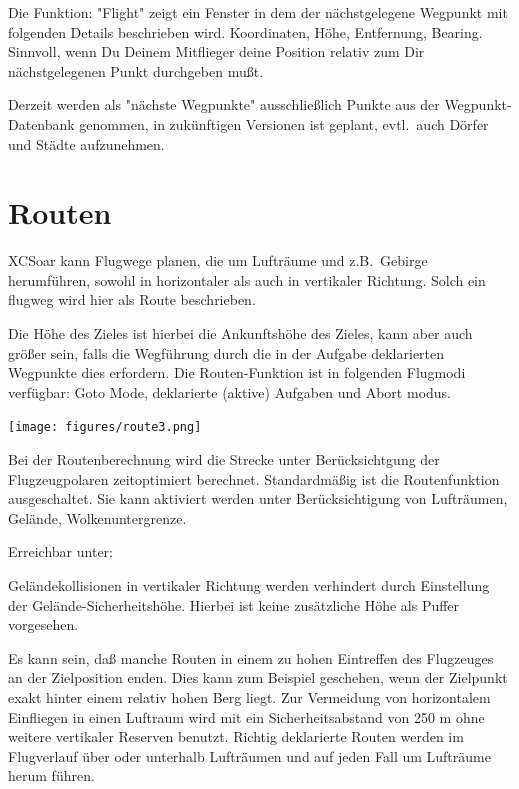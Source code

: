 Die Funktion: "Flight" zeigt ein Fenster in dem der nächstgelegene Wegpunkt mit folgenden Details beschrieben wird. Koordinaten, Höhe, Entfernung, Bearing.
Sinnvoll, wenn Du Deinem Mitflieger deine Position relativ zum Dir nächstgelegenen Punkt durchgeben mußt.

Derzeit werden als "nächste Wegpunkte" ausschließlich Punkte aus der Wegpunkt-Datenbank genommen, in zukünftigen Versionen ist geplant, evtl.\  auch Dörfer und Städte aufzunehmen.

\section{Routen}\label{sec:route}

\textsf{XCSoar} kann Flugwege planen, die um Lufträume und z.B.\ Gebirge herumführen, sowohl in horizontaler als auch in vertikaler Richtung. Solch ein flugweg wird hier als Route beschrieben.

Die Höhe des Zieles ist hierbei die Ankunftshöhe des Zieles, kann aber auch größer sein, falls die Wegführung durch die in der Aufgabe deklarierten Wegpunkte dies erfordern.
Die Routen-Funktion ist in folgenden Flugmodi verfügbar:
Goto Mode, deklarierte (aktive) Aufgaben und Abort modus.

\begin{center}
\texttt{[image: figures/route3.png]}
\end{center}

Bei der Routenberechnung wird die Strecke unter Berücksichtgung der Flugzeugpolaren zeitoptimiert berechnet. Standardmäßig ist die Routenfunktion ausgeschaltet. Sie kann aktiviert werden unter   Berücksichtigung von Lufträumen, Gelände, Wolkenuntergrenze.

Erreichbar unter:
\begin{quote}
\blink{}\blink{}\blink{}
\end{quote}

Geländekollisionen in vertikaler Richtung werden verhindert durch Einstellung der Gelände-Sicherheitshöhe.  Hierbei ist keine zusätzliche Höhe als Puffer vorgesehen.

Es kann sein, daß manche Routen in einem  zu hohen Eintreffen des Flugzeuges an der Zielposition enden. Dies kann zum Beispiel geschehen, wenn der Zielpunkt exakt hinter einem relativ hohen Berg liegt. Zur Vermeidung von horizontalem Einfliegen in einen Luftraum wird mit ein Sicherheitsabstand von 250 m ohne weitere vertikaler Reserven benutzt.
Richtig deklarierte Routen werden im Flugverlauf über oder unterhalb Lufträumen und auf jeden Fall um Lufträume herum führen.

